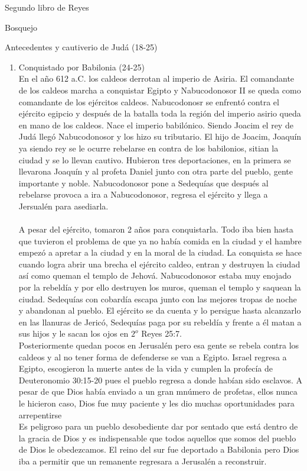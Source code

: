 \begin{section}{Segundo libro de Reyes}
\begin{subsection}{Bosquejo}
\begin{subsubsection}{Antecedentes y cautiverio de Judá (18-25)}
\begin{enumerate}
				\item Conquistado por Babilonia (24-25)\\
En el año 612 a.C. los caldeos derrotan al imperio de Asiria. El comandante de los caldeos marcha a conquistar Egipto y Nabucodonosor II se queda como comandante de los ejércitos caldeos. Nabucodonosr se enfrentó contra el ejército egipcio y después de la batalla toda la región del imperio asirio queda en mano de los caldeos. Nace el imperio babilónico. Siendo Joacim el rey de Judá llegó Nabucodonosor y los hizo su tributario. El hijo de Joacim, Joaquín  ya siendo rey se le ocurre rebelarse en contra de los babilonios, sitian la ciudad y se lo llevan cautivo. Hubieron tres deportaciones, en la primera se llevarona Joaquín y al profeta Daniel junto con otra parte del pueblo, gente importante y noble. Nabucodonosor pone a Sedequías que después al rebelarse provoca a ira a Nabucodonosor, regresa el ejército y llega a Jersualén para asediarla. \\ \\
A pesar del ejército, tomaron 2 años para conquistarla. Todo iba bien hasta que tuvieron el problema de que ya no había comida en la ciudad y el hambre empezó a apretar a la ciudad y en la moral de la ciudad. La conquista se hace cuando logra abrir una brecha el ejército caldeo, entran y destruyen la ciudad así como queman el templo de Jehová. Nabucodonosor estaba muy enojado por la rebeldía y por ello destruyen los muros, queman  el templo y saquean la ciudad. Sedequías con cobardía escapa junto con las mejores tropas de noche y abandonan al pueblo. El ejército se da cuenta y lo persigue hasta alcanzarlo en las llanuras de Jericó, Sedequías paga por su rebeldía y frente a él matan a sus hijos y le sacan los ojos en $2^{o}$ Reyes 25:7.\\
 Posteriormente quedan pocos en Jerusalén pero esa gente se rebela contra los caldeos y al no tener forma de defenderse se van a Egipto. Israel regresa a Egipto, escogieron la muerte antes de la vida y cumplen la profecía de Deuteronomio 30:15-20 pues el pueblo regresa a donde habían sido esclavos. A pesar de que Dios había enviado a un gran mnúmero de profetas, ellos nunca le hicieron caso, Dios fue muy paciente y les dio muchas oportunidades para arrepentirse\\
 Es peligroso para un pueblo desobediente dar por sentado que está dentro de la gracia de Dios y es indispensable que todos aquellos que somos del pueblo de Dios le obedezcamos. El reino del sur fue deportado a Babilonia pero Dios iba a permitir que un remanente regresara a Jerusalén a reconstruir.
			\end{enumerate}
		\end{subsubsection}
		\end{subsection}
\end{section}
%


